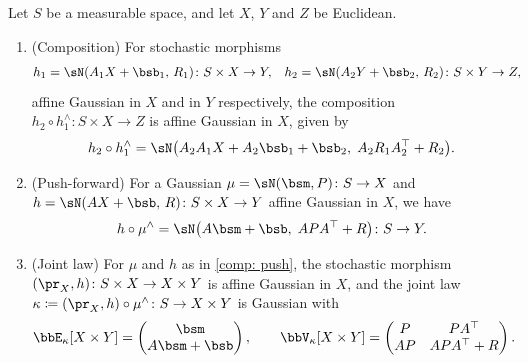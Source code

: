 \documentclass[12pt,reqno]{amsart}%
\theoremstyle{plain}
\theoremstyle{definition}
\begin{document}
\begin{proposition}\label{lem: composition}
	Let $S$ be a measurable space, and let $X$, $Y$ and $Z$ be Euclidean.
	\begin{enumerate}[label=(\roman*)]
		\item\label{comp: rule} (Composition)
		For stochastic morphisms
		\begin{align*}
			h_1&=\sN(A_1X+\bsb_1,\,R_1)\colon S\times X\rightarrow Y,&
				h_2&=\sN(A_2Y+\bsb_2,\,R_2)\colon S\times Y\rightarrow Z,
		\end{align*}
		affine Gaussian in $X$ and in $Y$ respectively,
		the composition $h_2\circ h_1^\wedge\colon S\times X\rightarrow Z$ is affine Gaussian in $X$, given by
		\begin{equation}\label{eq: composition rule}
			h_2\circ h_1^\wedge=\sN\bigl(A_2A_1X+A_2\bsb_1+\bsb_2,\;A_2R_1A_2^{\top}+R_2\bigr).
		\end{equation}
		\item\label{comp: push} (Push-forward) For a Gaussian $\mu=\sN(\bsm,P)\colon S\rightarrow X$ and
		$h=\sN(AX+\bsb,\,R)\colon S\times X\rightarrow Y$ affine Gaussian in $X$, we have
		\begin{equation}\label{eq: pushforward rule}
			h\circ\mu^\wedge=\sN\bigl(A\bsm+\bsb,\;APA^{\top}+R\bigr)\colon S\rightarrow Y.
		\end{equation}
		\item\label{comp: joint} (Joint law) For $\mu$ and $h$ as in \ref{comp: push}, the stochastic morphism
		$(\pr_X,h)\colon S\times X\rightarrow X\times Y$ is affine Gaussian in $X$, and the joint law
		$\kappa\coloneqq(\pr_X,h)\circ\mu^\wedge\colon S\rightarrow X\times Y$ is Gaussian with
		\begin{equation}\label{eq: joint law}
			\bbE_\kappa[X\times Y]=\begin{pmatrix}\bsm\\ A\bsm+\bsb\end{pmatrix},\qquad
			\bbV_\kappa[X\times Y]=
			\begin{pmatrix}
				P & PA^{\top} \\
				AP &APA^{\top}+R
			\end{pmatrix}.
		\end{equation}
	\end{enumerate}
\end{proposition}
\end{document}
